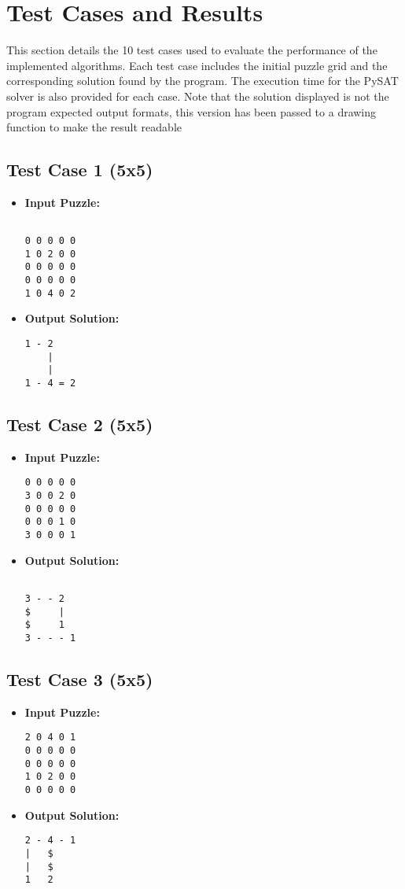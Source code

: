 \section{Test Cases and Results}
This section details the 10 test cases used to evaluate the performance of the implemented algorithms. Each test case includes the initial puzzle grid and the corresponding solution found by the program. The execution time for the PySAT solver is also provided for each case.
Note that the solution displayed is not the program expected output formats, this version has been passed to a drawing function to make the result readable
\subsection{Test Case 1 (5x5)}
\begin{itemize}
    \item \textbf{Input Puzzle:}
    \begin{verbatim}

0 0 0 0 0
1 0 2 0 0
0 0 0 0 0
0 0 0 0 0
1 0 4 0 2
    \end{verbatim}
    \item \textbf{Output Solution:}
    \begin{verbatim}
1 - 2    
    |    
    |    
1 - 4 = 2
    \end{verbatim}
\end{itemize}

\subsection{Test Case 2 (5x5)}
\begin{itemize}
    \item \textbf{Input Puzzle:}
    \begin{verbatim}
0 0 0 0 0
3 0 0 2 0
0 0 0 0 0
0 0 0 1 0
3 0 0 0 1

    \end{verbatim}
    \item \textbf{Output Solution:}
    \begin{verbatim}

3 - - 2
$     |
$     1
3 - - - 1
    \end{verbatim}
\end{itemize}

\subsection{Test Case 3 (5x5)}
\begin{itemize}
    \item \textbf{Input Puzzle:}
    \begin{verbatim}
2 0 4 0 1
0 0 0 0 0
0 0 0 0 0
1 0 2 0 0
0 0 0 0 0
    \end{verbatim}
    \item \textbf{Output Solution:}
    \begin{verbatim}
2 - 4 - 1
|   $    
|   $    
1   2    
    \end{verbatim}
\end{itemize}

